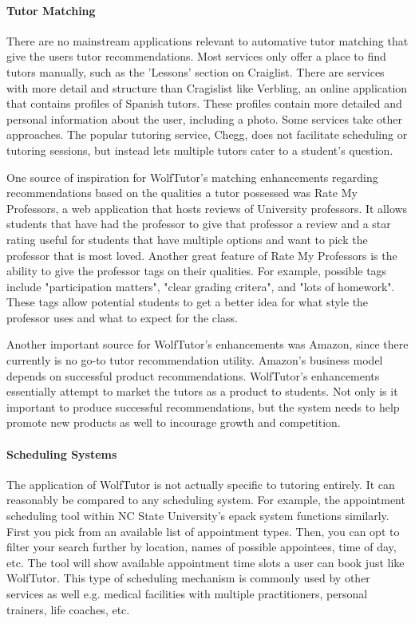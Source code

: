 \paragraph{Tutor Matching}
There are no mainstream applications relevant to automative tutor matching that give the users tutor recommendations. 
Most services only offer a place to find tutors manually, such as the 'Lessons' section on Craiglist. \cite{RefWorks:doc:5abd46a5e4b0770b05a4080c} 
There are services with more detail and structure than Cragislist like Verbling, an online application that contains profiles of Spanish tutors. 
These profiles contain more detailed and personal information about the user, including a photo. \cite{RefWorks:doc:5abd466ce4b0689719ee9277} 
Some services take other approaches. 
The popular tutoring service, Chegg, does not facilitate scheduling or tutoring sessions, 
but instead lets multiple tutors cater to a student's question. \cite{RefWorks:doc:5abd45f7e4b0770b05a407c4}

One source of inspiration for WolfTutor's matching enhancements regarding recommendations 
based on the qualities a tutor possessed was Rate My Professors, a web application that hosts reviews of University professors. 
It allows students that have had the professor to give that professor a review and a star rating useful for
students that have multiple options and want to pick the professor that is most loved. Another great
feature of Rate My Professors is the ability to give the professor tags on their qualities. For example, possible tags
include "participation matters", "clear grading critera", and "lots of homework". \cite{rate-my-prof} These tags allow potential students to
get a better idea for what style the professor uses and what to expect for the class.

Another important source for WolfTutor's enhancements was Amazon, since there currently is 
no go-to tutor recommendation utility.\cite{amazon} Amazon's business model depends on successful product recommendations.
WolfTutor's enhancements essentially attempt to market the tutors as a product to students. Not only is it important
to produce successful recommendations, but the system needs to help promote new products as well to incourage 
growth and competition.

\paragraph{Scheduling Systems}
The application of WolfTutor is not actually specific to tutoring entirely.
It can reasonably be compared to any scheduling system.
For example, the appointment scheduling tool within NC State University's epack system functions similarly.
First you pick from an available list of appointment types. Then, you can opt to filter your search further by location, names of possible appointees, time of day, etc.
The tool will show available appointment time slots a user can book just like WolfTutor.
This type of scheduling mechanism is commonly used by other services as well e.g. medical facilities with multiple practitioners, personal trainers, life coaches, etc.




